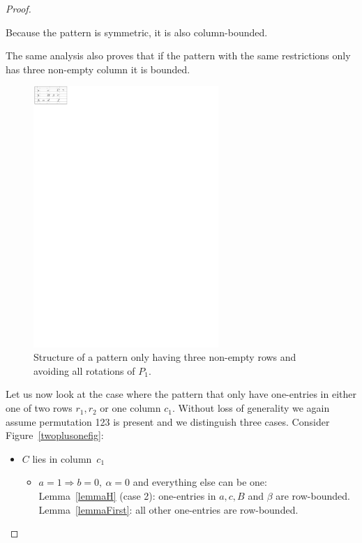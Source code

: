 \begin{proof}
\begin{itemize}
\begin{itemize}
\begin{itemize}
\begin{itemize}
								Because the pattern is symmetric, it is also column-bounded.
						\end{itemize}
				\end{itemize}
		\end{itemize}
\end{itemize}
The same analysis also proves that if the pattern with the same restrictions only has three non-empty column it is bounded.
\begin{figure}[!ht]
	\centering
	\includegraphics[width=70mm]{img/threelines.pdf}
	\caption{Structure of a pattern only having three non-empty rows and avoiding all rotations of $P_1$.}
	\label{threelinesfig}
\end{figure}

Let us now look at the case where the pattern that only have one-entries in either one of two rows $r_1,r_2$ or one column $c_1$. Without loss of generality we again assume permutation 123 is present and we distinguish three cases. Consider Figure~\ref{twoplusonefig}:
\begin{itemize}
\item $C$ lies in column~$c_1$
	\begin{itemize}
		\item $a=1\Rightarrow b=0,\ \alpha=0$ and everything else can be one:\\
			Lemma~\ref{lemmaH} (case 2): one-entries in $a,c,B$ and $\beta$ are row-bounded.\\
			Lemma~\ref{lemmaFirst}: all other one-entries are row-bounded.\\
			

\end{itemize}
\end{itemize}
\end{proof}
